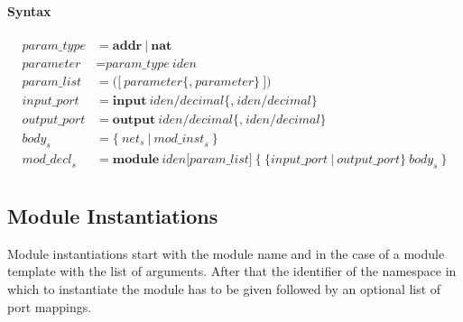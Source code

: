 \documentclass[a4paper,11pt,twoside]{report}
\begin{document}
{{{\paragraph{Syntax}
\begin{align*}
    \textit{param\_type} & \mathop{=}
        \textbf{addr}\ |\ \textbf{nat}\\
    \textit{parameter} & \mathop{=}
        \textit{param\_type}\ \textit{iden}\\
    \textit{param\_list} & \mathop{=}
        \textbf{(}\big[\ 
            \textit{parameter}\big\{\textbf{,}\ \textit{parameter}\big\}\ 
        \big] \textbf{)}\\
    \textit{input\_port} & \mathop{=}
        \textbf{input}\ \textit{iden}\textbf{/}\textit{decimal}
        \big\{
            \textbf{,}\ \textit{iden}\textbf{/}\textit{decimal}
        \big\}\\
    \textit{output\_port} & \mathop{=}
        \textbf{output}\ \textit{iden}\textbf{/}\textit{decimal}
        \big\{
            \textbf{,}\ \textit{iden}\textbf{/}\textit{decimal}
        \big\}\\
    \textit{body}_s & \mathop{=}
        \big\{\ 
            \textit{net}_s\ |\ \textit{mod\_inst}_s\ 
        \big\}\\
    \textit{mod\_decl}_s & \mathop{=}
        \textbf{module}\ \textit{iden} \big[\textit{param\_list}\big]\ 
        \textbf{\{}\ 
            \big\{\textit{input\_port}\ |\ \textit{output\_port}\big\}\ 
            \textit{body}_s\ 
        \textbf{\}}\\
\end{align*}

\subsection{Module Instantiations}
Module instantiations start with the module name and in the case of a module template with the list of arguments.
After that the identifier of the namespace in which to instantiate the module has to be given followed by an optional list of port mappings.

}}}
\end{document}
